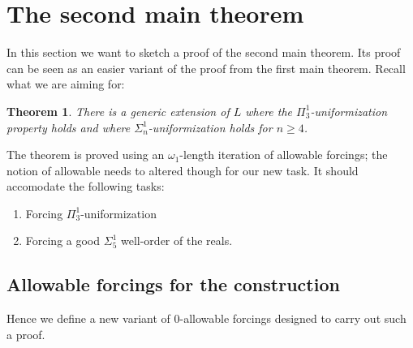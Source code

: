 \documentclass[a4paper,11pt]{article}
\newtheorem{theorem}{Theorem}[section]
\begin{document}
\section{The second main theorem}
In this section we want to sketch a proof of the second main theorem. Its proof can be seen as an easier variant of the proof from the first main theorem.
Recall what we are aiming for:
\begin{theorem}
There is a generic extension of $L$ where the
$\Pi^1_3$-uniformization property holds and where $\Sigma^1_n$-uniformization holds for $n \ge 4$.
\end{theorem}
The theorem is proved using an $\omega_1$-length iteration of allowable forcings; the notion of allowable needs to altered though for our new task. It should accomodate the following tasks:
\begin{enumerate}
\item Forcing $\Pi^1_3$-uniformization

\item Forcing a good $\Sigma^1_5$ well-order of the reals.
\end{enumerate}

\subsection{Allowable forcings for the construction}

Hence we define a new variant of 0-allowable forcings designed to carry out such a proof.
\end{document}
